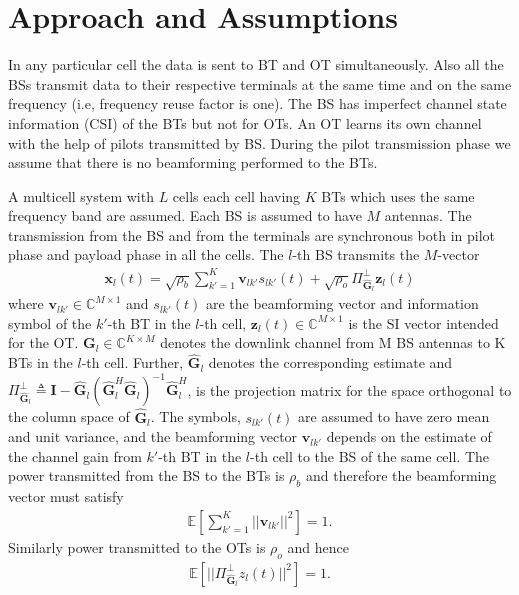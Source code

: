 \documentclass[10pt, a4paper, twoside,fleqn]{article}
\begin{document}
\section{Approach and Assumptions}	
	In any particular cell the data is sent to BT and OT simultaneously. Also all the BSs transmit data to their respective terminals at the same time and on the same frequency (i.e, frequency reuse factor is one). The BS has imperfect channel state information (CSI) of the BTs but not for OTs. An OT learns its own channel with the help of pilots transmitted by BS. During the pilot transmission phase we assume that there is no beamforming performed to the BTs.

	A multicell system with $L$ cells each cell having $K$ BTs which uses the same frequency band are assumed. Each BS is assumed to have $M$ antennas. The transmission from the BS and from the terminals are synchronous both in pilot phase and payload phase in all the cells. The $l$-th BS transmits the $M$-vector
\begin{eqnarray}\label{eqn:txbt}
	\pmb{x}_l(t) = \sqrt{\rho_b}\sum\limits_{k'=1}^{K}\pmb{v}_{lk'}s_{lk'}(t)
    		      + \sqrt{\rho_o}\Pi^{\perp}_{{\pmb{\widehat{G}}_l}}\pmb{z}_l(t)
\end{eqnarray}
where $\pmb{v}_{lk'}\in\mathbb{C}^{M\times 1}$ and $s_{lk'}(t)$ are the beamforming vector and information symbol of the $k'$-th BT in the $l$-th cell, $\pmb{z}_l(t) \in \mathbb{C}^{M\times 1}$  is the SI vector intended for the OT. $\pmb{G}_l \in {\mathbb C}^{K \times M}$ denotes the downlink channel from M BS antennas to K BTs in the $l$-th cell. Further, $\pmb{\widehat{G}}_l$ denotes the corresponding estimate and $\Pi^{\perp}_{{\pmb{\widehat{G}}_l}} \triangleq \pmb{I}-\pmb{\widehat{G}}_l(\pmb{\widehat{G}}_l^H\pmb{\widehat{G}}_l)^{-1}\pmb{\widehat{G}}_l^H$, is the projection matrix for the space orthogonal to the column space of $\pmb{\widehat{G}}_l$. The symbols, $s_{lk'}(t)$ are assumed to have zero mean and unit variance, and the beamforming vector $\pmb{v}_{lk'}$ depends on the estimate of the channel gain from $k'$-th BT in the $l$-th cell to the BS of the same cell. 
The power transmitted from the BS to the BTs is $\rho_b$ and therefore the beamforming vector must satisfy
\begin{eqnarray}\label{eqn:vkcondtion}
	\mathbb{E}\left[\sum\limits_{k'=1}^{K}||\pmb{v}_{lk'}||^2\right]=1.
\end{eqnarray}
Similarly power transmitted to the OTs is $\rho_o$ and hence
\begin{eqnarray}\label{eqn:zlcondition}
	\mathbb{E}\left[||\Pi^{\perp}_{\pmb{\widehat{G}}_l}z_l(t)||^2\right]=1.
\end{eqnarray}
\end{document}
